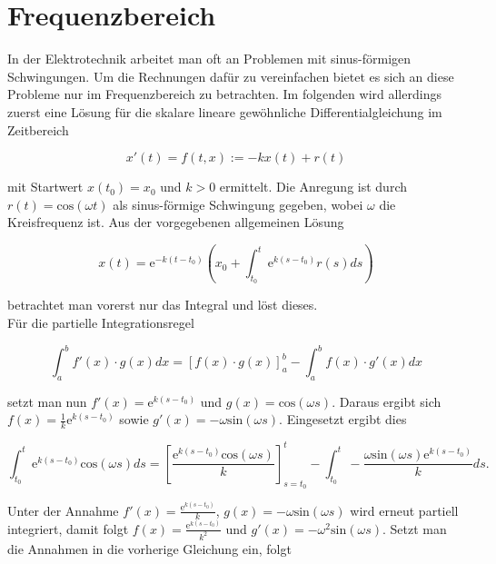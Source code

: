 \section{Frequenzbereich}\label{sec:ag3_2}

In der Elektrotechnik arbeitet man oft an Problemen mit sinus-förmigen Schwingungen. Um die Rechnungen dafür zu vereinfachen bietet es sich an diese Probleme nur im Frequenzbereich zu betrachten. 
Im folgenden wird allerdings zuerst eine Lösung für die skalare lineare gewöhnliche Differentialgleichung im Zeitbereich 

\begin{equation}
	x'(t) = f(t,x) := -kx(t) +r(t)
	\label{DGL}
\end{equation}

mit Startwert $x(t_0) = x_0$ und $k > 0$ ermittelt. Die Anregung ist durch $r(t) = \mathrm{cos}(\omega t)$ als sinus-förmige Schwingung gegeben, wobei $\omega$ die Kreisfrequenz ist.
Aus der vorgegebenen allgemeinen Lösung 

\begin{equation}
	x(t)=\mathrm{e}^{-k(t-t_0)} \left(x_0+\int_{t_0}^{t} \mathrm{e}^{k(s-t_0)}r(s)ds\right)
	\label{Ansatz}
\end{equation} 

betrachtet man vorerst nur das Integral und löst dieses.\\
Für die partielle Integrationsregel 

\begin{equation*}
	\int_{a}^{b}f'(x) \cdot g(x)dx = \left[f(x) \cdot g(x)\right]^{b}_{a} - \int_{a}^{b} f(x) \cdot g'(x)dx
\end{equation*}

setzt man nun $f'(x)=\mathrm{e}^{k(s-t_0)}$ und $g(x)=\mathrm{cos}(\omega s)$. Daraus ergibt sich $f(x)=\frac{1}{k}\mathrm{e}^{k(s-t_0)}$ sowie $g'(x)=-\omega \mathrm{sin}(\omega s)$. Eingesetzt ergibt dies 

\begin{equation*}
	\int_{t_0}^{t} \mathrm{e}^{k(s-t_0)}\mathrm{cos}(\omega s)ds = \left[ \frac{\mathrm{e}^{k(s-t_0)}\mathrm{cos}(\omega s)}{k} \right]^{t}_{s=t_0}-\int_{t_0}^{t}-\frac{\omega \mathrm{sin}(\omega s)\mathrm{e}^{k(s-t_0)}}{k} ds.
\end{equation*}

Unter der Annahme $f'(x)=\frac{\mathrm{e}^{k(s-t_0)}}{k}$, $g(x)=-\omega \mathrm{sin}(\omega s)$ wird erneut partiell integriert, damit folgt $f(x)=\frac{\mathrm{e}^{k(s-t_0)}}{k^2}$ und $g'(x)=-\omega^2 \mathrm{sin}(\omega s)$. Setzt man die Annahmen in die vorherige Gleichung ein, folgt

